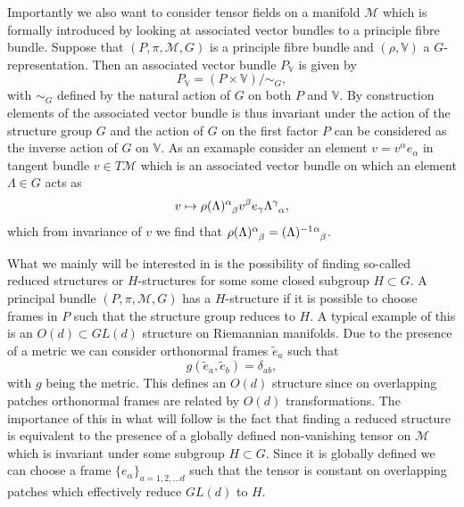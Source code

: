 
Importantly we also want to consider tensor fields on a manifold $\mathcal{M}$ which is formally introduced by looking at associated vector bundles to a principle fibre bundle. Suppose that $(P,\pi,\mathcal{M},G)$ is a principle fibre bundle and $(\rho,\mathbb{V})$ a $G$-representation. Then an associated vector bundle $P_{\mathbb{V}}$ is given by 
\begin{equation}
    P_{\mathbb{V}} = (P\times \mathbb{V})/\sim_G,
\end{equation}
with $\sim_G$ defined by the natural action of $G$ on both $P$ and $\mathbb{V}$. By construction elements of the associated vector bundle is thus invariant under the action of the structure group $G$ and the action of $G$ on the first factor $P$ can be considered as the inverse action of $G$ on $\mathbb{V}$. As an examaple consider an element $v=v^\alpha e_\alpha$ in tangent bundle $v\in T\mathcal{M}$ which is an associated vector bundle on which an element $\Lambda\in G$ acts as 
\begin{equation}
    v \mapsto \tensor{\rho(\Lambda)}{^\alpha_\beta} v^{\beta}e_\gamma \tensor{\Lambda}{^\gamma_\alpha},
\end{equation}
which from invariance of $v$ we find that $\tensor{\rho(\Lambda)}{^\alpha_\beta}= \tensor{(\Lambda)}{^{-1}}\tensor{}{^{\alpha}_\beta}$. 

What we mainly will be interested in is the possibility of finding so-called reduced structures or $H$-structures for some some closed subgroup $H\subset G$. A principal bundle $(P,\pi,\mathcal{M},G)$ has a $H$-structure if it is possible to choose frames in $P$ such that the structure group reduces to $H$. A typical example of this is an $O(d)\subset GL(d)$ structure on Riemannian manifolds. Due to the presence of a metric we can consider orthonormal frames $\tilde{e}_a$ such that 
\begin{equation}
    g(\tilde{e}_a,\tilde{e}_b) = \delta_{ab},
\end{equation}
with $g$ being the metric. This defines an $O(d)$ structure since on overlapping patches orthonormal frames are related by $O(d)$ transformations. The importance of this in what will follow is the fact that finding a reduced structure is equivalent to the presence of a globally defined non-vanishing tensor on $\mathcal{M}$ which is invariant under some subgroup $H\subset G$. Since it is globally defined we can choose a frame $\{e_{\alpha}\}_{a=1,2,\ldots d}$ such that the tensor is constant on overlapping patches which effectively reduce $GL(d)$ to $H$. 


